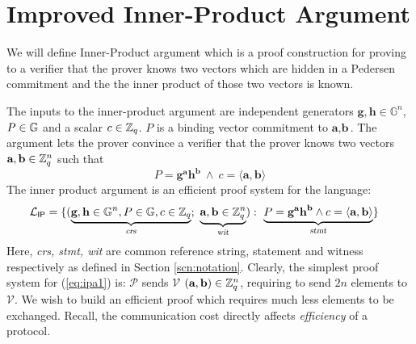 \section{Improved Inner-Product Argument}
\label{sec:iipa}

We will define Inner-Product argument which is a proof construction for proving to a verifier that the prover knows two vectors which are hidden in a Pedersen commitment and the the inner product of those two vectors is known. 

The inputs to the inner-product argument are independent generators $\textbf{g}, \textbf{h} \in \mathbb{G}^n$, $P\in \mathbb{G}$ and a scalar $c \in \mathbb{Z}_q$. $P$ is a binding vector commitment to $\textbf{a}, \textbf{b}$. 
The argument lets the prover convince a verifier that the prover knows two vectors $\textbf{a}, \textbf{b} \in \mathbb{Z}_q^n$ such that 
\begin{equation*}
    P = \textbf{g}^{\textbf{a}} \textbf{h}^{\textbf{b}} \ \wedge \ 
    c = \langle \textbf{a},\textbf{b} \rangle
\end{equation*}
The inner product argument is an efficient proof system for the language:
\begin{align}
    \mathcal{L}_{\textsf{IP}} &=
    \{ ( \underbrace{\textbf{g}, \textbf{h} \in \mathbb{G}^n, P \in \mathbb{G}, c \in \mathbb{Z}_q}_{\textsl{crs}};\
    \underbrace{\textbf{a}, \textbf{b} \in \mathbb{Z}_q^{n}}_{\textsl{wit}}):\
    \underbrace{P = \textbf{g}^{\textbf{a}}\textbf{h}^{\textbf{b}} \wedge c = \langle \textbf{a}, \textbf{b} \rangle}_{\textsl{stmt}} \}
    \label{eq:ipa1}
\end{align}
Here, \textsl{crs, stmt, wit} are common reference string, statement and witness respectively as defined in Section \ref{scn:notation}.
Clearly, the simplest proof system for (\ref{eq:ipa1}) is: $\mathcal{P}$ sends $\mathcal{V}$ $(\textbf{a},\textbf{b}) \in \mathbb{Z}_q^{n}$, requiring to send $2n$ elements to $\mathcal{V}$. We wish to build an efficient proof which requires much less elements to be exchanged. Recall, the communication cost directly affects \textit{efficiency} of a protocol.\\

